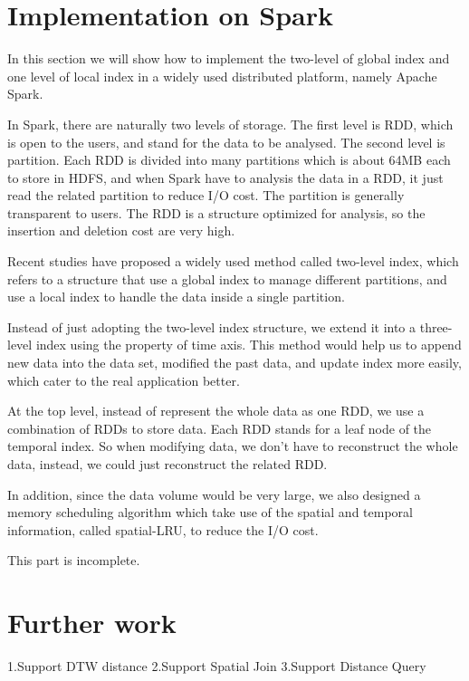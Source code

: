 \documentclass[sigplan]{acmart}
\begin{document}
\section{Implementation on Spark}
In this section we will show how to implement the two-level of global index and one level of local index in a widely used distributed platform, namely Apache Spark.\par
In Spark, there are naturally two levels of storage. The first level is RDD, which is open to the users, and stand for the data to be analysed. The second level is partition. Each RDD is divided into many partitions which is about 64MB each to store in HDFS, and when Spark have to analysis the data in a RDD, it just read the related partition to reduce I/O cost. The partition is generally transparent to users. The RDD is a structure optimized for analysis, so the insertion and deletion cost are very high.\par
Recent studies have proposed a widely used method called two-level index, which refers to a structure that use a global index to manage different partitions, and use a local index to handle the data inside a single partition. \par
Instead of just adopting the two-level index structure, we extend it into a three-level index using the property of time axis. This method would help us to append new data into the data set, modified the past data, and update index more easily, which cater to the real application better.\par
At the top level, instead of represent the whole data as one RDD, we use a combination of RDDs to store data. Each RDD stands for a leaf node of the temporal index. So when modifying data, we don't have to reconstruct the whole data, instead, we could just reconstruct the related RDD.\par
In addition, since the data volume would be very large, we also designed a memory scheduling algorithm which take use of the spatial and temporal information, called spatial-LRU, to reduce the I/O cost.\par

This part is incomplete.

\section{Further work}
1.Support DTW distance
2.Support Spatial Join
3.Support Distance Query



\end{document}
